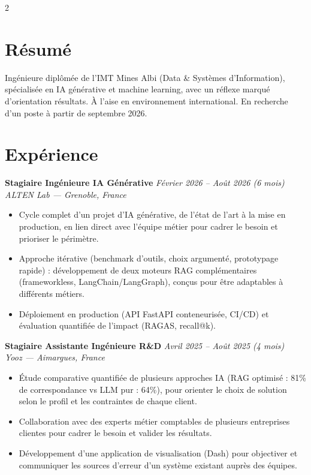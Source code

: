 \documentclass[10.5pt,a4paper]{article}
\newcommand{\sectionrule}{\vspace{-6pt}{\color{accent}\hrule height 1pt}\vspace{5pt}}
\newcommand{\cvexp}[5]{%
  \noindent\textbf{#1} \hfill {\itshape\color{graytext}\small #4}\\
  {\itshape #2 --- #3}\\[-2pt]
  #5
  \vspace{6pt}
}
\begin{document}
\setlength{\columnsep}{1.5em}
\begin{paracol}{2}

\section*{Résumé}
\sectionrule
\justifying
Ingénieure diplômée de l'IMT Mines Albi (Data \& Systèmes d'Information), spécialisée en IA générative et machine learning, avec un réflexe marqué d'orientation résultats. À l'aise en environnement international. En recherche d'un poste à partir de septembre 2026.

\section*{Expérience}
\sectionrule

\cvexp{Stagiaire Ingénieure IA Générative}{ALTEN Lab}{Grenoble, France}{Février 2026 -- Août 2026 (6 mois)}{%
  \begin{itemize}[leftmargin=12pt, itemsep=2pt, topsep=0pt, partopsep=0pt, parsep=0pt]
    \item Cycle complet d'un projet d'IA générative, de l'état de l'art à la mise en production, en lien direct avec l'équipe métier pour cadrer le besoin et prioriser le périmètre.
    \item Approche itérative (benchmark d'outils, choix argumenté, prototypage rapide) : développement de deux moteurs RAG complémentaires (frameworkless, LangChain/\allowbreak LangGraph), conçus pour être adaptables à différents métiers.
    \item Déploiement en production (API FastAPI conteneurisée, CI/CD) et évaluation quantifiée de l'impact (RAGAS, recall@k).
  \end{itemize}
}

\cvexp{Stagiaire Assistante Ingénieure R\&D}{Yooz}{Aimargues, France}{Avril 2025 -- Août 2025 (4 mois)}{%
  \begin{itemize}[leftmargin=12pt, itemsep=2pt, topsep=0pt, partopsep=0pt, parsep=0pt]
    \item Étude comparative quantifiée de plusieurs approches IA (RAG optimisé : 81\% de correspondance vs LLM pur : 64\%), pour orienter le choix de solution selon le profil et les contraintes de chaque client.
    \item Collaboration avec des experts métier comptables de plusieurs entreprises clientes pour cadrer le besoin et valider les résultats.
    \item Développement d'une application de visualisation (Dash) pour objectiver et communiquer les sources d'erreur d'un système existant auprès des équipes.
  \end{itemize}
}


\end{paracol}
\end{document}
